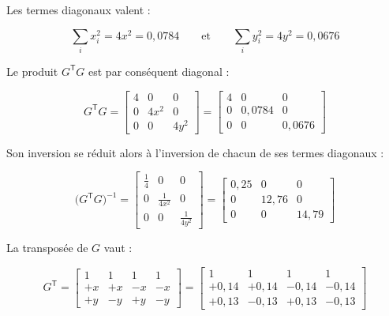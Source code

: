 Les termes diagonaux valent :

\begin{equation}
    \sum_i x_i^{2} = 4x^{2} = 0{,}0784
    \qquad\text{et}\qquad
    \sum_i y_i^{2} = 4y^{2} = 0{,}0676
\end{equation}

Le produit $G^{\mathsf T}G$ est par conséquent diagonal :

\begin{equation}
    G^{\mathsf T}G
    = \begin{bmatrix}
        4 & 0      & 0      \\
        0 & 4x^{2} & 0      \\
        0 & 0      & 4y^{2}
    \end{bmatrix}
    = \begin{bmatrix}
        4 & 0        & 0        \\
        0 & 0{,}0784 & 0        \\
        0 & 0        & 0{,}0676
    \end{bmatrix}
\end{equation}

Son inversion se réduit alors à l'inversion de chacun de ses termes
diagonaux :

\begin{equation}
    \bigl(G^{\mathsf T}G\bigr)^{-1}
    = \begin{bmatrix}
        \tfrac{1}{4} & 0                 & 0                 \\[2pt]
        0            & \tfrac{1}{4x^{2}} & 0                 \\[2pt]
        0            & 0                 & \tfrac{1}{4y^{2}}
    \end{bmatrix}
    = \begin{bmatrix}
        0{,}25 & 0       & 0       \\
        0      & 12{,}76 & 0       \\
        0      & 0       & 14{,}79
    \end{bmatrix}
\end{equation}

La transposée de $G$ vaut :

\begin{equation}
    G^{\mathsf T}
    = \begin{bmatrix}
        1  & 1  & 1  & 1  \\
        +x & +x & -x & -x \\
        +y & -y & +y & -y
    \end{bmatrix}
    = \begin{bmatrix}
        1       & 1       & 1       & 1       \\
        +0{,}14 & +0{,}14 & -0{,}14 & -0{,}14 \\
        +0{,}13 & -0{,}13 & +0{,}13 & -0{,}13
    \end{bmatrix}
\end{equation}


